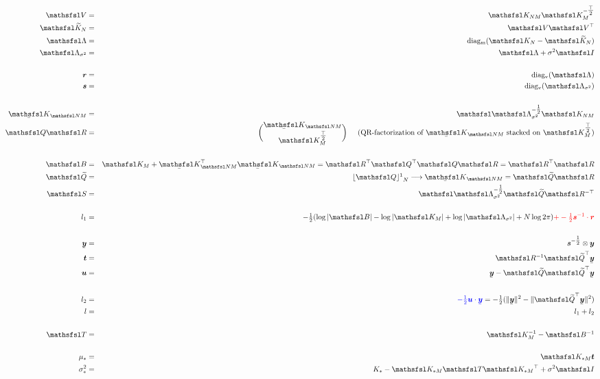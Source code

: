\documentclass[10pt]{report}
\begin{document}
\begin{eqnarray*}
\matV & = & \Knm\icholt{K_M} \\
\mat{\widetilde{K}_N} & = & \matV \transm{V} \\
\Lam & = & \diagm{\mat{K_N} - \mat{\widetilde{K}_N}} \\
\Lamss & = & \Lam + \sigma^2 \matI \\
\\
\vecr & = & \diagv{\Lam} \\
\vecs & = & \diagv{\Lamss} \\
\\
\uKnm & = & \ichol{\Lamss} \Knm \\
\matQ \matR & = & {\uKnm\choose\cholt{K_M}} \hspace{5mm}
\textrm{(QR-factorization of $\uKnm$ stacked on $\cholt{K_M}$)} \\
\\
\matB & = & \Km + \uKmn\uKnm = \transm{R}\transm{Q} \mat{Q} \matR = \transm{R}\matR \\
\matQn & = & {\lfloor \matQ \rfloor\footnotemark}_{N} \longrightarrow \uKnm = \matQn \matR \\
\matS & = & \ichol{\Lamss}\matQn\itransm{R} \\
\\
l_1 & = & -\onehalf (\log|\matB| - \log|\Km| + \log|\Lamss| + N \log 2\pi) \red{+ -\onehalf\vecis \cdot \vecr} \\
\\
\uvecy & = & \veciss \otimes \vecy \\
\vect & = & \imat{R} \tmatQn \uvecy \\
\vecu & = & \uvecy - \matQn \tmatQn \uvecy \\
\\
l_2 & = & \blue{-\onehalf \vecu\cdot\uvecy} = -\onehalf(\|\uvecy\|^2 - \|\tmatQn \uvecy\|^2) \\
l & = & l_1 + l_2 \\
\\
\matT & = & \imat{K_M} - \imat{B} \\
\\
\mu_* & = & \mat{K_{*M}} \vect \\
\sigma^2_* & = & K_* - \mat{K_{*M}}\matT\transm{K_{*M}} + \sigma^2 \matI \\
\end{eqnarray*}
\end{document}
